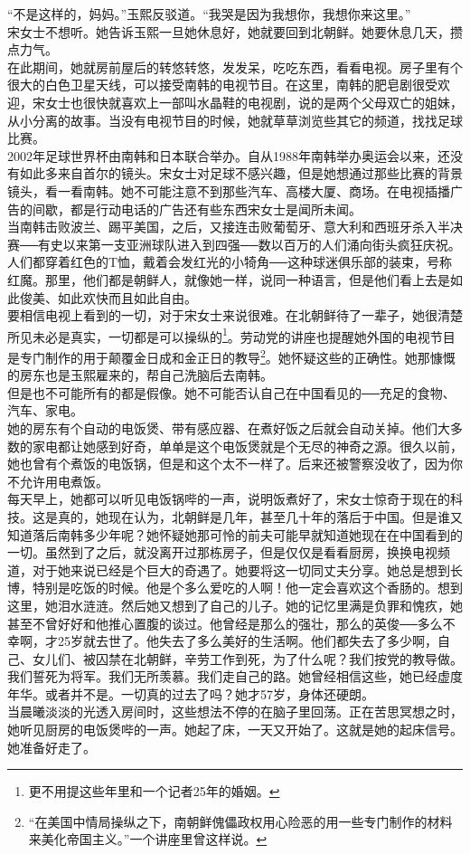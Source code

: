 “不是这样的，妈妈。”玉熙反驳道。“我哭是因为我想你，我想你来这里。”\\

宋女士不想听。她告诉玉熙一旦她休息好，她就要回到北朝鲜。她要休息几天，攒点力气。\\

在此期间，她就房前屋后的转悠转悠，发发呆，吃吃东西，看看电视。房子里有个很大的白色卫星天线，可以接受南韩的电视节目。在这里，南韩的肥皂剧很受欢迎，宋女士也很快就喜欢上一部叫水晶鞋的电视剧，说的是两个父母双亡的姐妹，从小分离的故事。当没有电视节目的时候，她就草草浏览些其它的频道，找找足球比赛。\\

2002年足球世界杯由南韩和日本联合举办。自从1988年南韩举办奥运会以来，还没有如此多来自首尔的镜头。宋女士对足球不感兴趣，但是她想通过那些比赛的背景镜头，看一看南韩。她不可能注意不到那些汽车、高楼大厦、商场。在电视插播广告的间歇，都是行动电话的广告还有些东西宋女士是闻所未闻。\\

当南韩击败波兰、踢平美国，之后，又接连击败葡萄牙、意大利和西班牙杀入半决赛──有史以来第一支亚洲球队进入到四强──数以百万的人们涌向街头疯狂庆祝。人们都穿着红色的T恤，戴着会发红光的小犄角──这种球迷俱乐部的装束，号称红魔。那里，他们都是朝鲜人，就像她一样，说同一种语言，但是他们看上去是如此俊美、如此欢快而且如此自由。\\

要相信电视上看到的一切，对于宋女士来说很难。在北朝鲜待了一辈子，她很清楚所见未必是真实，一切都是可以操纵的\footnote{更不用提这些年里和一个记者25年的婚姻。}。劳动党的讲座也提醒她外国的电视节目是专门制作的用于颠覆金日成和金正日的教导\footnote{“在美国中情局操纵之下，南朝鲜傀儡政权用心险恶的用一些专门制作的材料来美化帝国主义。”一个讲座里曾这样说。}。她怀疑这些的正确性。她那慷慨的房东也是玉熙雇来的，帮自己洗脑后去南韩。\\

但是也不可能所有的都是假像。她不可能否认自己在中国看见的──充足的食物、汽车、家电。\\

她的房东有个自动的电饭煲、带有感应器、在煮好饭之后就会自动关掉。他们大多数的家电都让她感到好奇，单单是这个电饭煲就是个无尽的神奇之源。很久以前，她也曾有个煮饭的电饭锅，但是和这个太不一样了。后来还被警察没收了，因为你不允许用电煮饭。\\

每天早上，她都可以听见电饭锅哔的一声，说明饭煮好了，宋女士惊奇于现在的科技。这是真的，她现在认为，北朝鲜是几年，甚至几十年的落后于中国。但是谁又知道落后南韩多少年呢？她怀疑她那可怜的前夫可能早就知道她现在在中国看到的一切。虽然到了之后，就没离开过那栋房子，但是仅仅是看看厨房，换换电视频道，对于她来说已经是个巨大的奇遇了。她要将这一切同丈夫分享。她总是想到长博，特别是吃饭的时候。他是个多么爱吃的人啊！他一定会喜欢这个香肠的。想到这里，她泪水涟涟。然后她又想到了自己的儿子。她的记忆里满是负罪和愧疚，她甚至不曾好好和他推心置腹的谈过。他曾经是那么的强壮，那么的英俊──多么不幸啊，才25岁就去世了。他失去了多么美好的生活啊。他们都失去了多少啊，自己、女儿们、被囚禁在北朝鲜，辛劳工作到死，为了什么呢？我们按党的教导做。我们誓死为将军。我们无所羡慕。我们走自己的路。她曾经相信这些，她已经虚度年华。或者并不是。一切真的过去了吗？她才57岁，身体还硬朗。\\

当晨曦淡淡的光透入房间时，这些想法不停的在脑子里回荡。正在苦思冥想之时，她听见厨房的电饭煲哔的一声。她起了床，一天又开始了。这就是她的起床信号。她准备好走了。\\
